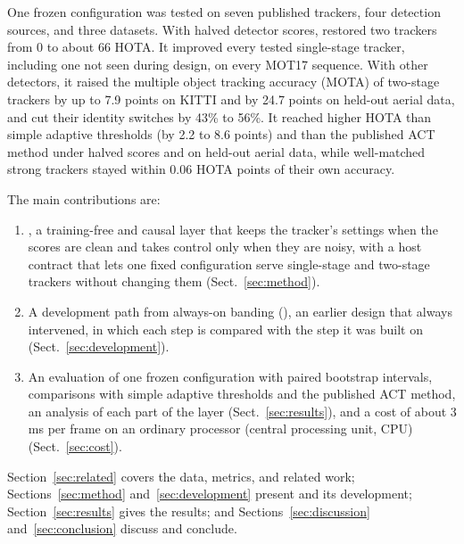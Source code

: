 One frozen configuration was tested on seven published trackers, four detection sources, and
three datasets. With halved detector scores, \scl{} restored two trackers from 0 to about 66 HOTA.
It improved every tested single-stage tracker, including one not seen during design, on every
MOT17 sequence. With other detectors, it raised the multiple object tracking accuracy (MOTA) of
two-stage trackers by up to 7.9 points on KITTI and by 24.7 points on held-out aerial data, and cut
their identity switches by 43\% to 56\%. It reached higher HOTA than simple adaptive thresholds
(by 2.2 to 8.6 points) and than the published ACT method under halved scores and on held-out aerial
data, while well-matched strong trackers stayed within 0.06 HOTA points of their own accuracy.

The main contributions are:
\begin{enumerate}
\item \scl{}, a training-free and causal layer that keeps the tracker's settings when the scores are
      clean and takes control only when they are noisy, with a host contract that lets one fixed
      configuration serve single-stage and two-stage trackers without changing them
      (Sect.~\ref{sec:method}).
\item A development path from always-on banding (\aob{}), an earlier design that always
      intervened, in which each step is compared with the step it was built on
      (Sect.~\ref{sec:development}).
\item An evaluation of one frozen configuration with paired bootstrap intervals, comparisons with
      simple adaptive thresholds and the published ACT method, an analysis of each part of the
      layer (Sect.~\ref{sec:results}), and a cost of about 3 ms per frame on an ordinary processor
      (central processing unit, CPU) (Sect.~\ref{sec:cost}).
\end{enumerate}

Section~\ref{sec:related} covers the data, metrics, and related work;
Sections~\ref{sec:method} and~\ref{sec:development} present \scl{} and its development;
Section~\ref{sec:results} gives the results; and Sections~\ref{sec:discussion}
and~\ref{sec:conclusion} discuss and conclude.
